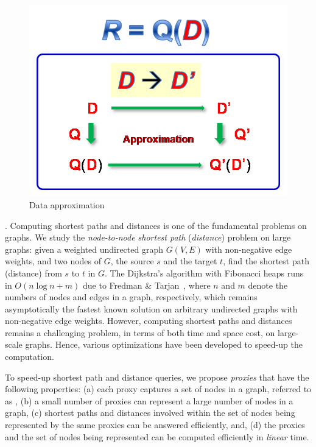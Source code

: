 \begin{figure}[tb!]
  \begin{center}
  \includegraphics[scale=0.45]{./dataApprox.png}
  \end{center}
  \caption{Data approximation}\label{fig-tech-dataappro}
  \vspace{-1ex}
\end{figure}


. Computing shortest paths and distances is one of the fundamental problems on graphs. We study the {\em node-to-node shortest path} ({\em distance}) problem on large graphs: given a weighted undirected graph $G(V, E)$ with non-negative edge weights, and two nodes of $G$, the source $s$ and the target $t$, find the shortest path (distance) from $s$ to $t$ in $G$. The Dijkstra's algorithm with Fibonacci heaps runs in $O(n\log n + m)$ due to Fredman \& Tarjan~\cite{CormenLRS01}, where $n$ and $m$ denote the numbers of nodes and edges in a graph, respectively, which remains asymptotically the fastest known solution on arbitrary undirected graphs with non-negative edge weights.
However, computing shortest  paths and distances remains a challenging problem, in terms of both time and space cost, on large-scale graphs. Hence, various optimizations have been developed to speed-up the computation.

To speed-up shortest  path and distance queries, we propose {\em proxies} that have the following properties:
%
(a) each proxy captures a set of nodes in a graph, referred to as \dra,
%
(b) a small number of proxies can represent a large number of nodes in a graph,
%
(c) shortest paths and distances involved within the set of nodes being represented by the same proxies can be answered efficiently, and,
%
(d) the proxies and the set of nodes being represented can be computed efficiently in {\em linear} time.



